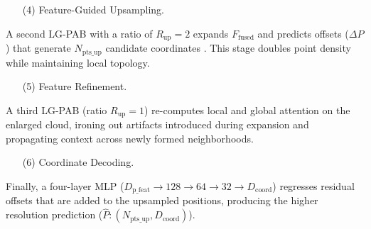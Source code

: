 \documentclass[remotesensing,article,accept,pdftex,moreauthors]{Definitions/mdpi}
\begin{document}
\begin{enumerate}
\item[(4)] {Feature-Guided Upsampling.}
\end{enumerate}

A second LG-PAB with a ratio of $R_{\text{up}}=2$ expands $F_{\text{fused}}$ and predicts offsets ($\Delta P$) that generate $N_{\text{pts\_up}}$ candidate coordinates%
. This stage doubles point density while maintaining local topology.

\begin{enumerate}
\item[(5)] {Feature Refinement.}
\end{enumerate}

A third LG-PAB (ratio $R_{\text{up}}=1$) re-computes local and global attention on the enlarged cloud, ironing out artifacts introduced during expansion and propagating context across newly formed neighborhoods.

\begin{enumerate}
\item[(6)] {Coordinate Decoding.}
\end{enumerate}

Finally, a four-layer MLP ($D_{\text{p\_feat}} \rightarrow 128 \rightarrow 64 \rightarrow 32 \rightarrow D_{\text{coord}}$) regresses residual offsets that are added to the upsampled positions, producing the higher resolution prediction ($\hat{P}: (N_{\text{pts\_up}}, D_{\text{coord}})$).

\end{document}
